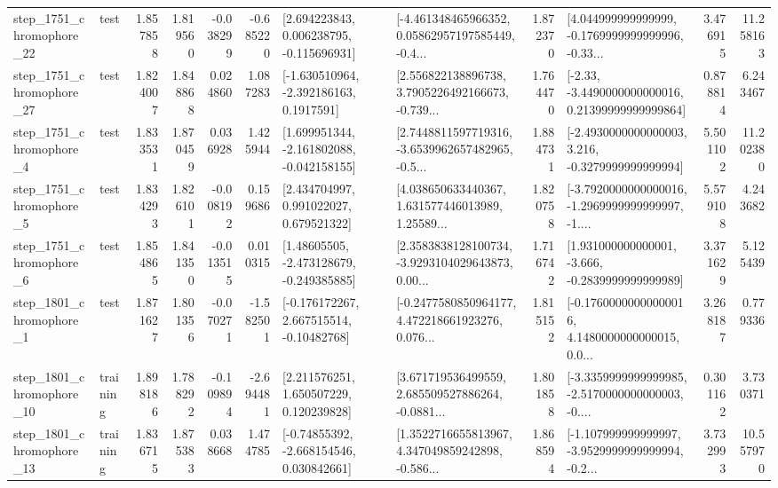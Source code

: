 \begin{tabular}{llrrrrllrlrr}
 step\_1751\_chromophore\_22 &      test &      1.857858 &    1.819560 &     -0.038299 & -0.685220 &    [2.694223843, 0.006238795, -0.115696931] &  [-4.461348465966352, 0.05862957197585449, -0.4... &       1.872370 &  [4.044999999999999, -0.1769999999999996, -0.33... &            3.476915 &         11.258163 \\
 step\_1751\_chromophore\_27 &      test &      1.824007 &    1.848868 &      0.024860 &  1.087283 &     [-1.630510964, -2.392186163, 0.1917591] &  [2.556822138896738, 3.7905226492166673, -0.739... &       1.764470 &  [-2.33, -3.4490000000000016, 0.21399999999999864] &            0.878814 &          6.243467 \\
  step\_1751\_chromophore\_4 &      test &      1.833531 &    1.870459 &      0.036928 &  1.425944 &   [1.699951344, -2.161802088, -0.042158155] &  [2.7448811597719316, -3.6539962657482965, -0.5... &       1.884731 &  [-2.4930000000000003, 3.216, -0.3279999999999994] &            5.501102 &         11.202380 \\
  step\_1751\_chromophore\_5 &      test &      1.834293 &    1.826101 &     -0.008192 &  0.159686 &     [2.434704997, 0.991022027, 0.679521322] &  [4.038650633440367, 1.631577446013989, 1.25589... &       1.820758 &  [-3.7920000000000016, -1.2969999999999997, -1.... &            5.579108 &          4.243682 \\
  step\_1751\_chromophore\_6 &      test &      1.854865 &    1.841350 &     -0.013515 &  0.010315 &    [1.48605505, -2.473128679, -0.249385885] &  [2.3583838128100734, -3.9293104029643873, 0.00... &       1.716742 &   [1.931000000000001, -3.666, -0.2839999999999989] &            3.371629 &          5.125439 \\
  step\_1801\_chromophore\_1 &      test &      1.871627 &    1.801356 &     -0.070271 & -1.582501 &    [-0.176172267, 2.667515514, -0.10482768] &  [-0.2477580850964177, 4.472218661923276, 0.076... &       1.815152 &  [-0.17600000000000016, 4.1480000000000015, 0.0... &            3.268187 &          0.779336 \\
 step\_1801\_chromophore\_10 &  training &      1.898186 &    1.788292 &     -0.109894 & -2.694481 &     [2.211576251, 1.650507229, 0.120239828] &  [3.671719536499559, 2.685509527886264, -0.0881... &       1.801858 &  [-3.3359999999999985, -2.5170000000000003, -0.... &            0.301162 &          3.730371 \\
 step\_1801\_chromophore\_13 &  training &      1.836715 &    1.875383 &      0.038668 &  1.474785 &    [-0.74855392, -2.668154546, 0.030842661] &  [1.3522716655813967, 4.347049859242898, -0.586... &       1.868594 &  [-1.107999999999997, -3.9529999999999994, -0.2... &            3.732993 &         10.557970 \\

\end{tabular}
